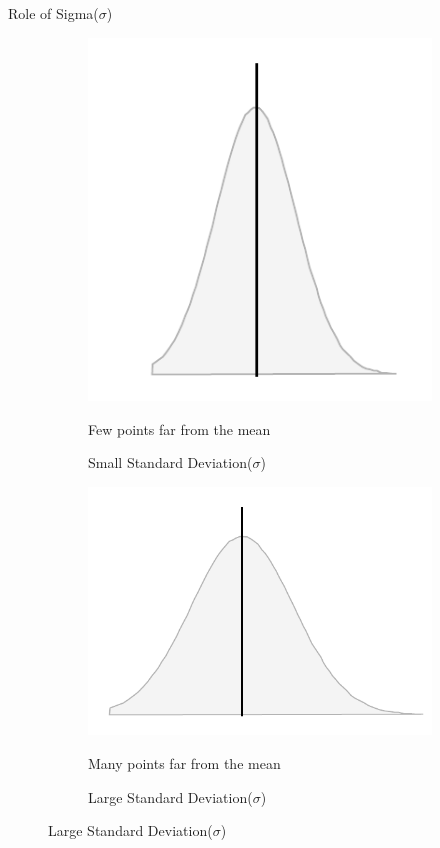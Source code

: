 \begin{frame}[t]{Role of Sigma($\sigma$)}
	\begin{figure}[h]
		\centering
		\begin{subfigure}{0.45\textwidth}
			\centering
			\includegraphics[scale=0.5]{eda/std1.png}
			\caption{Small Standard Deviation($\sigma$)}
			Few points far from the mean
		\end{subfigure}
		\hfil
		\begin{subfigure}{0.45\textwidth}
			\centering
			\includegraphics[scale=0.5]{eda/std2.png}
			\caption{ Large Standard Deviation($\sigma$)}
			 Many points far from the mean
			
		\end{subfigure}
		
	\end{figure}
\end{frame}
